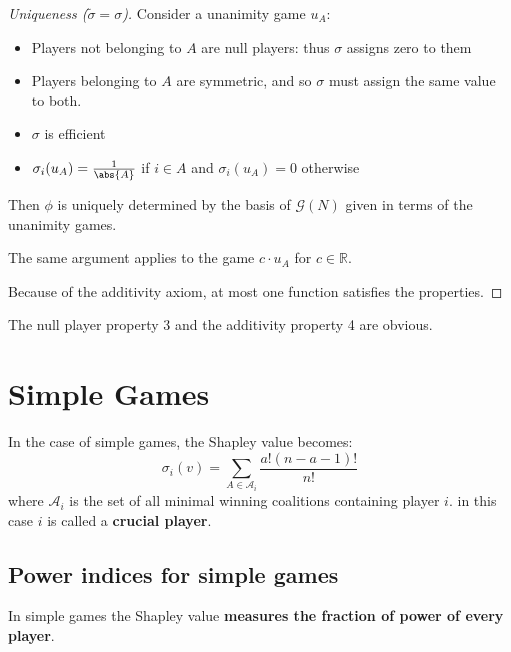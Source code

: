 \documentclass[../main.tex]{subfiles}
\begin{document}
\begin{proof}[Uniqueness ($\tilde{\sigma} = \sigma$)]
    Consider a unanimity game $u_A$:
    \begin{itemize}[noitemsep]
        \item Players not belonging to $A$ are null players: thus $\sigma$ assigns zero to them
        \item Players belonging to $A$ are symmetric, and so $\sigma$ must assign the same value to both.
        \item $\sigma$ is efficient
        \item $\sigma_i (u_A) = \frac{1}{\abs{A}}$ if $i \in A$ and $\sigma_i (u_A) = 0$ otherwise
    \end{itemize}
    Then $\phi$ is uniquely determined by the basis of $\mathcal{G}(N)$ given in terms of the
    unanimity games.

    The same argument applies to the game $c \cdot u_A$ for $c \in \mathbb{R}$.

    Because of the additivity axiom, at most one function satisfies the properties.
\end{proof}
The null player property 3 and the additivity property 4 are obvious.

\section{Simple Games}
In the case of simple games, the Shapley value becomes:
\[
    \sigma_i(v) = \sum_{A \in \mathcal{A}_i} \frac{a!(n-a-1)!}{n!}
\]
where $\mathcal{A}_i$ is the set of all minimal winning coalitions containing player $i$. in this case $i$ is called a \textbf{crucial player}.

\subsection{Power indices for simple games}
In simple games the Shapley value \textbf{measures the fraction of power of every player}.
\end{document}
